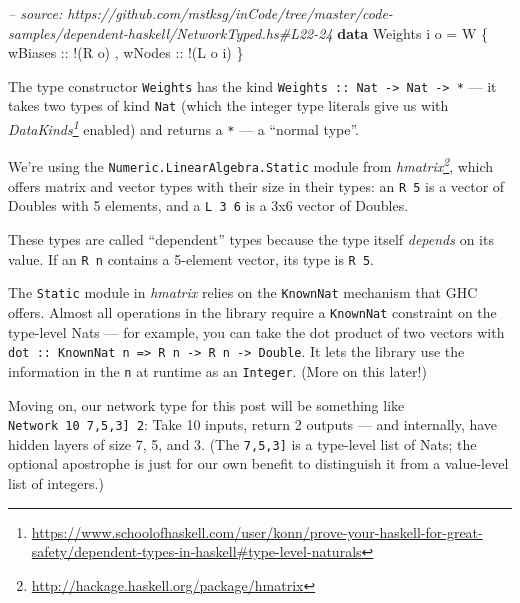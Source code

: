 \documentclass[]{article}
\newenvironment{Shaded}{}{}
\newcommand{\KeywordTok}[1]{\textcolor[rgb]{0.00,0.44,0.13}{\textbf{{#1}}}}
\newcommand{\DataTypeTok}[1]{\textcolor[rgb]{0.56,0.13,0.00}{{#1}}}
\newcommand{\CommentTok}[1]{\textcolor[rgb]{0.38,0.63,0.69}{\textit{{#1}}}}
\newcommand{\OtherTok}[1]{\textcolor[rgb]{0.00,0.44,0.13}{{#1}}}
\newcommand{\FunctionTok}[1]{\textcolor[rgb]{0.02,0.16,0.49}{{#1}}}
\newcommand{\NormalTok}[1]{{#1}}
\renewcommand{\href}[2]{#2\footnote{\url{#1}}}
\begin{document}
\begin{Shaded}
\begin{Highlighting}[]
\CommentTok{-- source: https://github.com/mstksg/inCode/tree/master/code-samples/dependent-haskell/NetworkTyped.hs#L22-24}
\KeywordTok{data} \DataTypeTok{Weights} \NormalTok{i o }\FunctionTok{=} \DataTypeTok{W} \NormalTok{\{}\OtherTok{ wBiases ::} \FunctionTok{!}\NormalTok{(}\DataTypeTok{R} \NormalTok{o)}
                     \NormalTok{,}\OtherTok{ wNodes  ::} \FunctionTok{!}\NormalTok{(}\DataTypeTok{L} \NormalTok{o i)}
                     \NormalTok{\}}
\end{Highlighting}
\end{Shaded}

The type constructor \texttt{Weights} has the kind
\texttt{Weights\ ::\ Nat\ -\textgreater{}\ Nat\ -\textgreater{}\ *} ---
it takes two types of kind \texttt{Nat} (which the integer type literals
give us with
\emph{\href{https://www.schoolofhaskell.com/user/konn/prove-your-haskell-for-great-safety/dependent-types-in-haskell\#type-level-naturals}{DataKinds}}
enabled) and returns a \texttt{*} --- a ``normal type''.

We're using the \texttt{Numeric.LinearAlgebra.Static} module from
\emph{\href{http://hackage.haskell.org/package/hmatrix}{hmatrix}}, which
offers matrix and vector types with their size in their types: an
\texttt{R\ 5} is a vector of Doubles with 5 elements, and a
\texttt{L\ 3\ 6} is a 3x6 vector of Doubles.

These types are called ``dependent'' types because the type itself
\emph{depends} on its value. If an \texttt{R\ n} contains a 5-element
vector, its type is \texttt{R\ 5}.

The \texttt{Static} module in \emph{hmatrix} relies on the
\texttt{KnownNat} mechanism that GHC offers. Almost all operations in
the library require a \texttt{KnownNat} constraint on the type-level
Nats --- for example, you can take the dot product of two vectors with
\texttt{dot\ ::\ KnownNat\ n\ =\textgreater{}\ R\ n\ -\textgreater{}\ R\ n\ -\textgreater{}\ Double}.
It lets the library use the information in the \texttt{n} at runtime as
an \texttt{Integer}. (More on this later!)

Moving on, our network type for this post will be something like
\texttt{Network\ 10\ \textquotesingle{}{[}7,5,3{]}\ 2}: Take 10 inputs,
return 2 outputs --- and internally, have hidden layers of size 7, 5,
and 3. (The \texttt{\textquotesingle{}{[}7,5,3{]}} is a type-level list
of Nats; the optional \texttt{\textquotesingle{}} apostrophe is just for
our own benefit to distinguish it from a value-level list of integers.)
\end{document}
